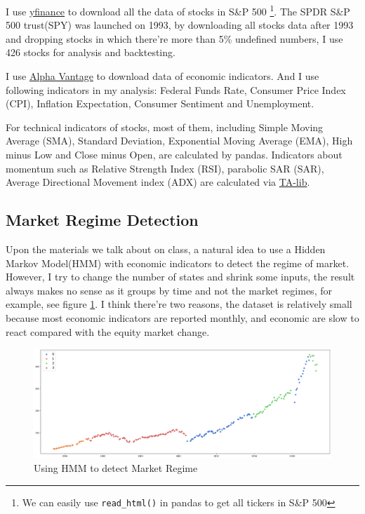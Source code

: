 \documentclass[a4paper,12pt]{article}
\begin{document}
I use \href{https://github.com/ranaroussi/yfinance}{yfinance} to download all the data of stocks in S\&P 500 \footnote[1]{We can easily use \lstinline{read_html()} in pandas to get all tickers in S\&P 500}. The SPDR S\&P 500 trust(SPY) was launched on 1993, by downloading all stocks data after 1993 and dropping stocks in which there're more than 5\% undefined numbers, I use 426 stocks for analysis and backtesting.

I use \href{https://www.alphavantage.co/}{Alpha Vantage} to download data of economic indicators. And I use following indicators in my analysis: Federal Funds Rate, Consumer Price Index (CPI), Inflation Expectation, Consumer Sentiment and Unemployment.

For technical indicators of stocks, most of them, including Simple Moving Average (SMA), Standard Deviation, Exponential Moving Average (EMA), High minus Low and Close minus Open, are calculated by pandas. Indicators about momentum such as Relative Strength Index (RSI),  parabolic SAR (SAR), Average Directional Movement index (ADX) are calculated via \href{https://mrjbq7.github.io/ta-lib/}{TA-lib}.

\subsection{Market Regime Detection}

Upon the materials we talk about on class, a natural idea to use a Hidden Markov Model(HMM) with economic indicators to detect the regime of market. However, I try to change the number of states and shrink some inputs, the result always makes no sense as it groups by time and not the market regimes, for example, see figure \ref{hmm_figure}. I think there're two reasons, the dataset is relatively small because most economic indicators are reported monthly, and economic are slow to react compared with the equity market change.

\begin{figure}[H]
    \includegraphics[scale=0.3]{hmm_eco_indic.png}
    \caption{Using HMM to detect Market Regime}\label{hmm_figure}
\end{figure}
\end{document}
